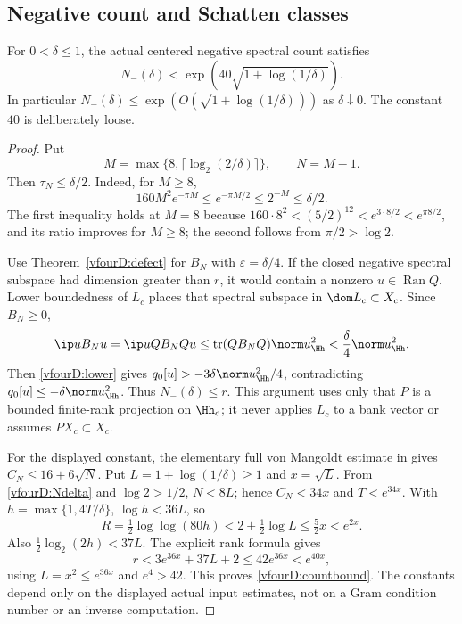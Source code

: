 \subsection{Negative count and Schatten classes}\label{vfourD:count}
\begin{theorem}\label{vfourD:main}
For $0<\delta\le1$, the actual centered negative spectral count satisfies
\begin{equation}\label{vfourD:countbound}
 N_-(\delta)<\exp\!\left(40\sqrt{1+\log(1/\delta)}\right).
\end{equation}
In particular $N_-(\delta)\le\exp(O(\sqrt{1+\log(1/\delta)}))$ as $\delta\downarrow0$. The constant $40$ is deliberately loose.
\end{theorem}
\begin{proof}
Put
\begin{equation}\label{vfourD:Ndelta}
 M=\max\{8,\lceil\log_2(2/\delta)\rceil\},\qquad N=M-1.
\end{equation}
Then $\tau_N\le\delta/2$. Indeed, for $M\ge8$,
\[160M^2e^{-\pi M}\le e^{-\pi M/2}\le2^{-M}\le\delta/2.
\]
The first inequality holds at $M=8$ because $160\cdot8^2<(5/2)^{12}<e^{3\cdot8/2}<e^{\pi8/2}$, and its ratio improves for $M\ge8$; the second follows from $\pi/2>\log2$.

Use Theorem~\ref{vfourD:defect} for $B_N$ with $\varepsilon=\delta/4$. If the closed negative spectral subspace had dimension greater than $r$, it would contain a nonzero $u\in\operatorname{Ran}Q$. Lower boundedness of $L_c$ places that spectral subspace in $\dom L_c\subset X_c$. Since $B_N\ge0$,
\[\ip u{B_Nu}=\ip u{QB_NQu}\le\operatorname{tr}(QB_NQ)\norm u_{\Hh}^2<\frac\delta4\norm u_{\Hh}^2.
\]
Then \eqref{vfourD:lower} gives $q_0[u]>-3\delta\norm u_{\Hh}^2/4$, contradicting $q_0[u]\le-\delta\norm u_{\Hh}^2$. Thus $N_-(\delta)\le r$. This argument uses only that $P$ is a bounded finite-rank projection on $\Hh_c$; it never applies $L_c$ to a bank vector or assumes $P X_c\subset X_c$.

For the displayed constant, the elementary full von Mangoldt estimate in \cite{vfourTrace} gives $C_N\le16+6\sqrt N$. Put $L=1+\log(1/\delta)\ge1$ and $x=\sqrt L$. From \eqref{vfourD:Ndelta} and $\log2>1/2$, $N<8L$; hence $C_N<34x$ and $T<e^{34x}$. With $h=\max\{1,4T/\delta\}$, $\log h<36L$, so
\[R=\tfrac12\log\log(80h)<2+\tfrac12\log L\le\tfrac52x<e^{2x}.
\]
Also $\tfrac12\log_2(2h)<37L$. The explicit rank formula gives
\[r<3e^{36x}+37L+2\le42e^{36x}<e^{40x},
\]
using $L=x^2\le e^{36x}$ and $e^4>42$. This proves \eqref{vfourD:countbound}. The constants depend only on the displayed actual input estimates, not on a Gram condition number or an inverse computation.
\end{proof}
